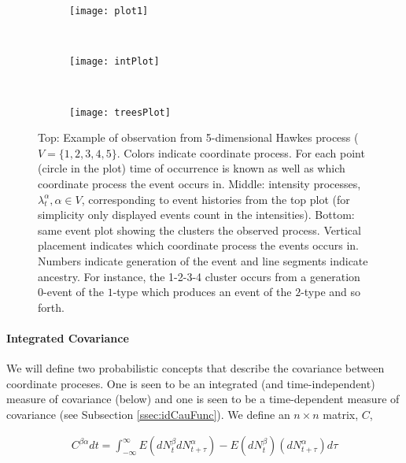 \documentclass[accepted]{uai2021} %
\begin{document}
\begin{figure}
				\begin{subfigure}{0.48\linewidth}
					\centering
					\texttt{[image: plot1]}
				\end{subfigure} \\
				\begin{subfigure}{0.48\linewidth}
					\centering
					\texttt{[image: intPlot]}
				\end{subfigure} \\
				\begin{subfigure}{0.48\linewidth}
					\centering
					\texttt{[image: treesPlot]}
				\end{subfigure}
				\caption{Top: Example of observation from 5-dimensional Hawkes 
				process ($V = \{1,2,3,4,5\}$. Colors indicate coordinate 
				process. For each point 
				(circle in the plot) time of occurrence is known as well as 
				which coordinate process the event occurs in. Middle: intensity 
				processes, $\lambda_t^\alpha, \alpha\in V$, corresponding to 
				event 
				histories from the top plot (for simplicity only displayed 
				events 
				count in the intensities). Bottom: same event plot showing the 
				clusters the observed process. Vertical placement indicates 
				which coordinate process the events occurs in. Numbers indicate 
				generation 
				of the event and line segments indicate ancestry. For instance, 
				the 1-2-3-4 cluster occurs from a generation 0-event of the 
				$1$-type which produces an event of the $2$-type and so forth.}
			\label{fig:haw}
\end{figure}


\paragraph{Integrated Covariance}

We will define two probabilistic concepts that describe the covariance between 
coordinate proceses. One 
is seen to be an integrated (and time-independent) measure of covariance 
(below) and 
one is seen to be a 
time-dependent measure of covariance (see Subsection \ref{ssec:idCauFunc}). We 
define an $n\times n$ matrix, $C$,

\begin{align}
	C^{\beta\alpha} dt = \int_{-\infty}^{\infty} E(dN_t^\beta 
	dN_{t+\tau}^\alpha) - E(dN_t^\beta )(dN_{t+\tau}^\alpha) d\tau
\end{align}
\end{document}
